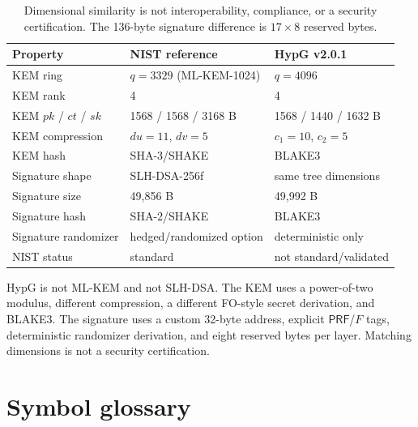 \documentclass[runningheads]{llncs}
\newcommand{\PRF}{\mathsf{PRF}}
\begin{document}
\begin{table}[t]
\centering
\small
\begin{tabular}{@{}lll@{}}
\toprule
Property & NIST reference & HypG v2.0.1 \\
\midrule
KEM ring & $q=3329$ (ML-KEM-1024) & $q=4096$ \\
KEM rank & 4 & 4 \\
KEM $pk$ / $ct$ / $sk$ & 1568 / 1568 / 3168 B & 1568 / 1440 / 1632 B \\
KEM compression & $du=11$, $dv=5$ & $c_1=10$, $c_2=5$ \\
KEM hash & SHA-3/SHAKE & BLAKE3 \\
Signature shape & SLH-DSA-256f & same tree dimensions \\
Signature size & 49,856 B & 49,992 B \\
Signature hash & SHA-2/SHAKE & BLAKE3 \\
Signature randomizer & hedged/randomized option & deterministic only \\
NIST status & standard & not standard/validated \\
\bottomrule
\end{tabular}
\caption{Dimensional similarity is not interoperability, compliance, or
a security certification.  The 136-byte signature difference is
$17\times8$ reserved bytes.}
\label{tab:fips}
\end{table}

HypG is not ML-KEM and not SLH-DSA.  The KEM uses a power-of-two modulus,
different compression, a different FO-style secret derivation, and
BLAKE3.  The signature uses a custom 32-byte address, explicit
$\PRF$/$F$ tags, deterministic randomizer derivation, and eight reserved
bytes per layer.  Matching dimensions is not a security certification.

\section{Symbol glossary}
\label{app:glossary}
\end{document}
